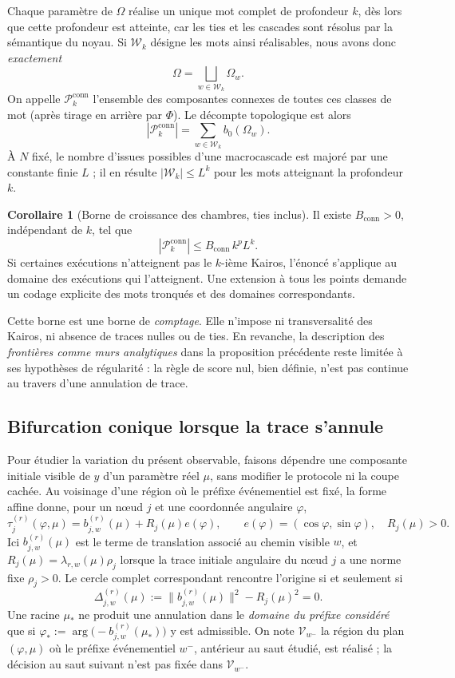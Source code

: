 \documentclass[11pt,a4paper]{article}
\theoremstyle{definition}
\newtheorem{corollary}[definition]{Corollaire}
\theoremstyle{remark}
\begin{document}
Chaque paramètre de $\Omega$ réalise un unique mot complet de profondeur $k$, dès lors que cette profondeur est atteinte, car les ties et les cascades sont résolus par la sémantique du noyau. Si $\mathcal W_k$ désigne les mots ainsi réalisables, nous avons donc \emph{exactement}
\[
 \boxed{\Omega=\bigsqcup_{w\in\mathcal W_k}\Omega_w.}
\]
On appelle $\mathcal P_k^{\mathrm{conn}}$ l'ensemble des composantes connexes de toutes ces classes de mot (après tirage en arrière par $\Phi$). Le décompte topologique est alors
\[
 \boxed{ |\mathcal P_k^{\mathrm{conn}}|=\sum_{w\in\mathcal W_k} b_0(\Omega_w).}
\]
À $N$ fixé, le nombre d'issues possibles d'une macrocascade est majoré par une constante finie $L$ ; il en résulte $|\mathcal W_k|\le L^k$ pour les mots atteignant la profondeur $k$.
\begin{corollary}[Borne de croissance des chambres, ties inclus]
\label{cor:borne-croissance-ties}
Il existe $B_{\mathrm{conn}}>0$, indépendant de $k$, tel que
\[
 \boxed{|\mathcal P_k^{\mathrm{conn}}|\le B_{\mathrm{conn}}\,k^pL^k.}
\]
Si certaines exécutions n'atteignent pas le $k$-ième Kairos, l'énoncé s'applique au domaine des exécutions qui l'atteignent. Une extension à tous les points demande un codage explicite des mots tronqués et des domaines correspondants.
\end{corollary}

Cette borne est une borne de \emph{comptage}. Elle n'impose ni transversalité des Kairos, ni absence de traces nulles ou de ties. En revanche, la description des \emph{frontières comme murs analytiques} dans la proposition précédente reste limitée à ses hypothèses de régularité : la règle de score nul, bien définie, n'est pas continue au travers d'une annulation de trace.

\subsection{Bifurcation conique lorsque la trace s'annule}

Pour étudier la variation du présent observable, faisons dépendre une composante initiale visible de $y$ d'un paramètre réel $\mu$, sans modifier le protocole ni la coupe cachée. Au voisinage d'une région où le préfixe événementiel est fixé, la forme affine donne, pour un nœud $j$ et une coordonnée angulaire $\varphi$,
\[
 \tau_j^{(r)}(\varphi,\mu)
 =b_{j,w}^{(r)}(\mu)+R_j(\mu)e(\varphi),\qquad
 e(\varphi)=(\cos\varphi,\sin\varphi),\quad R_j(\mu)>0.
\]
Ici $b_{j,w}^{(r)}(\mu)$ est le terme de translation associé au chemin visible $w$, et $R_j(\mu)=\lambda_{r,w}(\mu)\rho_j$ lorsque la trace initiale angulaire du nœud $j$ a une norme fixe $\rho_j>0$. Le cercle complet correspondant rencontre l'origine si et seulement si
\[
 \boxed{\Delta_{j,w}^{(r)}(\mu)
 :=\bigl\|b_{j,w}^{(r)}(\mu)\bigr\|^2-R_j(\mu)^2=0.}
\]
Une racine $\mu_*$ ne produit une annulation dans le \emph{domaine du préfixe considéré} que si $\varphi_*:=\arg\!\bigl(-b_{j,w}^{(r)}(\mu_*)\bigr)$ y est admissible. On note $\mathcal V_{w^-}$ la région du plan $(\varphi,\mu)$ où le préfixe événementiel $w^-$, antérieur au saut étudié, est réalisé ; la décision au saut suivant n'est pas fixée dans $\mathcal V_{w^-}$.
\end{document}
